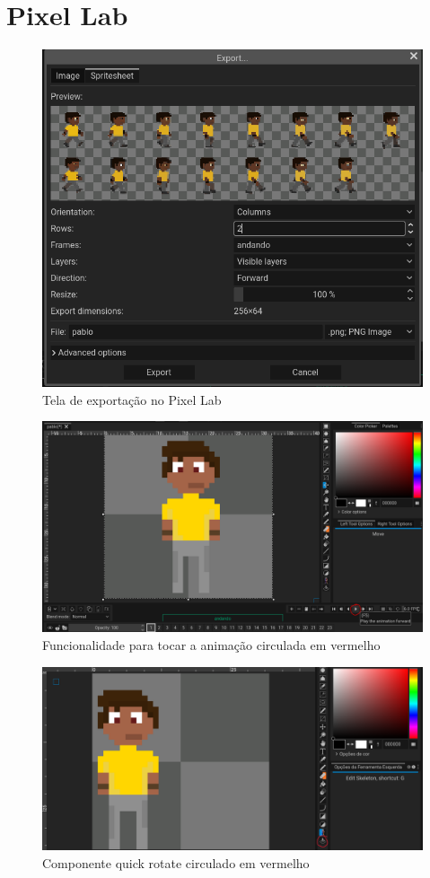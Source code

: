 \FloatBarrier
\section{Pixel Lab}
\label{s.pixelLabApendice}

\begin{figure}[htbp]
    \centering
    \caption{\small Tela de exportação no Pixel Lab}
    \label{fig:pixelLabExport}
    \includegraphics[width=0.7\linewidth]{figs/pixelLab/tela_exportar.PNG}
\end{figure}

\begin{figure}[htbp]
    \centering
    \caption{\small Funcionalidade para tocar a animação circulada em vermelho}
    \label{fig:pixelLabViewAnimation}
    \includegraphics[width=0.7\linewidth]{figs/pixelLab/tela_ver_animacao.PNG}
\end{figure}

\begin{figure}[htbp]
    \centering
    \caption{\small Componente quick rotate circulado em vermelho}
    \label{fig:pixelLabQuickRotateTela}
    \includegraphics[width=0.7\linewidth]{figs/pixelLab/dia1/quick_rotate.PNG}
\end{figure}

